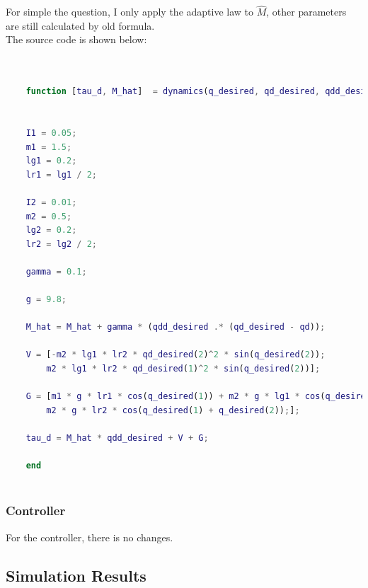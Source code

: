 \documentclass{article}
\begin{document}
For simple the question, I only apply the adaptive law to $\hat{M}$, other parameters are still calculated by old formula.\\

The source code is shown below:
\begin{lstlisting}[language=Matlab, basicstyle=\small\ttfamily]


    function [tau_d, M_hat]  = dynamics(q_desired, qd_desired, qdd_desired, qd, M_hat)


    I1 = 0.05;
    m1 = 1.5;
    lg1 = 0.2;
    lr1 = lg1 / 2;
    
    I2 = 0.01;
    m2 = 0.5;
    lg2 = 0.2;
    lr2 = lg2 / 2;
    
    gamma = 0.1;
    
    g = 9.8;
    
    M_hat = M_hat + gamma * (qdd_desired .* (qd_desired - qd));
    
    V = [-m2 * lg1 * lr2 * qd_desired(2)^2 * sin(q_desired(2));
        m2 * lg1 * lr2 * qd_desired(1)^2 * sin(q_desired(2))];
    
    G = [m1 * g * lr1 * cos(q_desired(1)) + m2 * g * lg1 * cos(q_desired(1));
        m2 * g * lr2 * cos(q_desired(1) + q_desired(2));];
    
    tau_d = M_hat * qdd_desired + V + G;
    
    end
    
\end{lstlisting}

\subsubsection*{Controller}
For the controller, there is no changes.\\


\subsection{Simulation Results}
\end{document}

